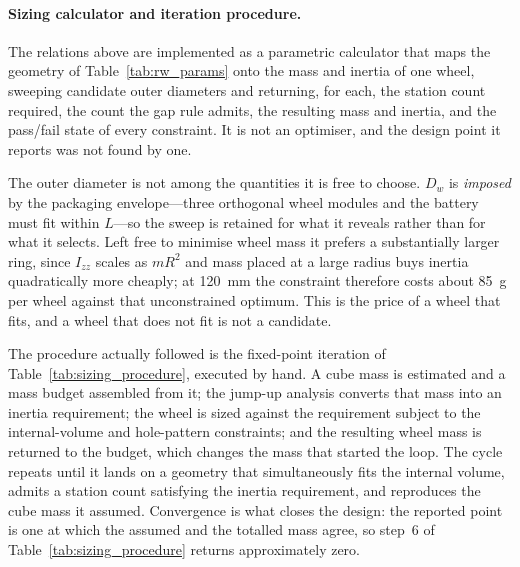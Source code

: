 
\paragraph{Sizing calculator and iteration procedure.} The relations
above are implemented as a parametric calculator that maps the geometry of
Table~\ref{tab:rw_params} onto the mass and inertia of one wheel, sweeping
candidate outer diameters and returning, for each, the station count required,
the count the gap rule admits, the resulting mass and inertia, and the
pass\slash fail state of every constraint. It is not an optimiser, and the
design point it reports was not found by one.

The outer diameter is not among the quantities it is free to choose. $D_w$ is
\emph{imposed} by the packaging envelope---three orthogonal wheel modules and
the battery must fit within $L$---so the sweep is retained for what it reveals
rather than for what it selects. Left free to minimise wheel mass it prefers a
substantially larger ring, since $I_{zz}$ scales as $mR^2$ and mass placed at a
large radius buys inertia quadratically more cheaply; at
\qty{120}{\milli\metre} the constraint therefore costs about \qty{85}{\gram}
per wheel against that unconstrained optimum. This is the price of a wheel that
fits, and a wheel that does not fit is not a candidate.

The procedure actually followed is the fixed-point iteration of
Table~\ref{tab:sizing_procedure}, executed by hand. A cube mass is estimated
and a mass budget assembled from it; the jump-up analysis converts that mass
into an inertia requirement; the wheel is sized against the requirement subject
to the internal-volume and hole-pattern constraints; and the resulting wheel
mass is returned to the budget, which changes the mass that started the loop.
The cycle repeats until it lands on a geometry that simultaneously fits the
internal volume, admits a station count satisfying the inertia requirement, and
reproduces the cube mass it assumed. Convergence is what closes the design:
the reported point is one at which the assumed and the totalled mass agree, so
step~6 of Table~\ref{tab:sizing_procedure} returns approximately zero.

